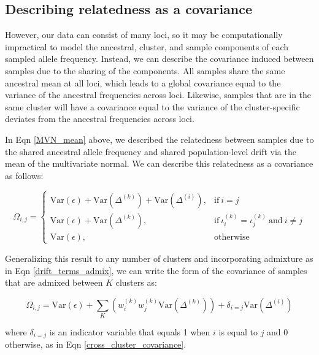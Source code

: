 \documentclass[12pt]{article}
\begin{document}
%

\subsection{Describing relatedness as a covariance}
However, our data can consist of many loci, 
so it may be computationally impractical to model 
the ancestral, cluster, and sample components of each sampled allele frequency.
Instead, we can describe the covariance induced between samples due to the sharing of the components.
All samples share the same ancestral mean at all loci, 
which leads to a global covariance equal to the variance of the ancestral frequencies across loci.
Likewise, samples that are in the same cluster will have a covariance equal to the variance 
of the cluster-specific deviates from the ancestral frequencies across loci.

In Eqn \ref{MVN_mean} above, we described the relatedness between samples
due to the shared ancestral allele frequency and shared population-level drift
via the mean of the multivariate normal.
We can describe this relatedness as a covariance as follows:

\begin{equation}
	\Omega_{i,j} = 
	\begin{cases}
	      \text{Var}(\epsilon) +  \text{Var}\left( \Delta^{(k)} \right) + \text{Var}\left( \Delta^{(i)} \right), & \text{if}\ i=j\ \\
      	      \text{Var}(\epsilon) +  \text{Var}\left( \Delta^{(k)} \right), & \text{if}\ \iota^{(k)}_i = \iota^{(k)}_j\ \text{and}\ i \neq j \\
	      \text{Var}(\epsilon), & \text{otherwise}
	\end{cases}
\label{MVN_covar}
\end{equation}


Generalizing this result to any number of clusters and incorporating admixture as in Eqn \ref{drift_terms_admix}, 
we can write the form of the covariance of samples that are admixed between $K$ clusters as:

\begin{equation}
\Omega_{i,j} = \text{Var}(\epsilon) + \sum\limits_K \left(	w^{(k)}_iw^{(k)}_j \text{Var}(\Delta^{(k)}) 	\right) + 
\delta_{i=j} \text{Var}(\Delta^{(i)})
\label{admixed_discrete_covariance}
\end{equation}

where $\delta_{i=j}$ is an indicator variable that equals 1 when $i$ is equal to $j$ and 0 otherwise,
as in Eqn \ref{cross_cluster_covariance}.
\end{document}
